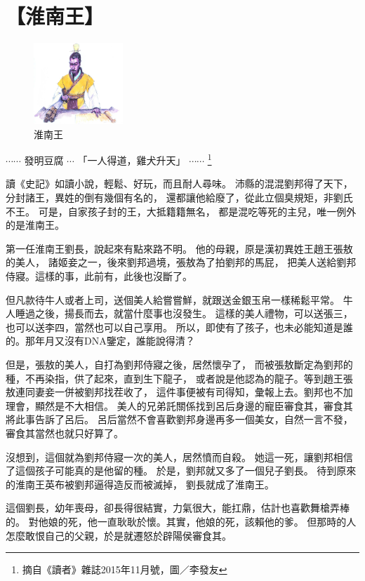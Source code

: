 \chapter{【淮南王】}
\begin{figure}
\centering
\includegraphics[width=0.3\textwidth]{pics/p002.jpg}
\vspace{-25pt}
\caption{淮南王}
\end{figure}

$\cdots\cdots$ 發明豆腐 $\cdots$ 「一人得道，雞犬升天」 $\cdots\cdots$
\footnote{摘自{\Kai《讀者》}雜誌2015年11月號，圖／李發友}


讀{\Kai《史記》}如讀小說，輕鬆、好玩，而且耐人尋味。
沛縣的混混劉邦得了天下，分封諸王，異姓的倒有幾個有名的，
還都讓他給廢了，從此立個臭規矩，非劉氏不王。
可是，自家孩子封的王，大抵籍籍無名，
都是混吃等死的主兒，唯一例外的是淮南王。

第一任淮南王劉長，說起來有點來路不明。
他的母親，原是漢初異姓王趙王張敖的美人，
諸姬妾之一，後來劉邦過境，張敖為了拍劉邦的馬屁，
把美人送給劉邦侍寢。這樣的事，此前有，此後也沒斷了。

但凡款待牛人或者上司，送個美人給嘗嘗鮮，就跟送金銀玉帛一樣稀鬆平常。
牛人睡過之後，揚長而去，就當什麼事也沒發生。
這樣的美人禮物，可以送張三，也可以送李四，當然也可以自己享用。
所以，即使有了孩子，也未必能知道是誰的。那年月又沒有DNA鑒定，誰能說得清？

但是，張敖的美人，自打為劉邦侍寢之後，居然懷孕了，
而被張敖斷定為劉邦的種，不再染指，供了起來，直到生下龍子，
或者說是他認為的龍子。等到趙王張敖連同妻妾一併被劉邦找茬收了，
這件事便被有司得知，彙報上去。劉邦也不加理會，顯然是不大相信。
美人的兄弟託關係找到呂后身邊的寵臣審食其，審食其將此事告訴了呂后。
呂后當然不會喜歡劉邦身邊再多一個美女，自然一言不發，審食其當然也就只好算了。

沒想到，這個就為劉邦侍寢一次的美人，居然憤而自殺。
她這一死，讓劉邦相信了這個孩子可能真的是他留的種。
於是，劉邦就又多了一個兒子劉長。
待到原來的淮南王英布被劉邦逼得造反而被滅掉，
劉長就成了淮南王。

這個劉長，幼年喪母，卻長得很結實，力氣很大，能扛鼎，估計也喜歡舞槍弄棒的。
對他娘的死，他一直耿耿於懷。其實，他娘的死，該賴他的爹。
但那時的人怎麼敢恨自己的父親，於是就遷怒於辟陽侯審食其。

